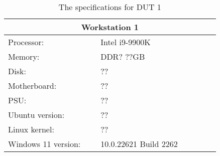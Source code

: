 \begin{table}[H]
    \centering
    \begin{tabular}{|| p{0.38\linewidth} | p{0.49\linewidth} ||}
    \hline
    \multicolumn{2}{||c||}{Workstation 1}           \\ [0.5ex] \hline\hline
    Processor:          & Intel i9-9900K \\
    Memory:             & DDR? ??GB                     \\
    Disk:               & ?? \\
    Motherboard:        & ??      \\
    PSU:                & ?? \\
    Ubuntu version:     & ??        \\
    Linux kernel:       & ??       \\
    Windows 11 version: & 10.0.22621 Build 2262 \\ \hline
    \end{tabular}
    \caption{The specifications for DUT 1}
    \label{tab:DUT1}
\end{table}